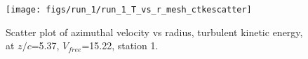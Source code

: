 \begin{figure}[H]
\centering
\texttt{[image: figs/run\_1/run\_1\_T\_vs\_r\_mesh\_ctkescatter]}
\caption{Scatter plot of azimuthal velocity vs radius, turbulent kinetic energy, at $z/c$=5.37, $V_{free}$=15.22, station 1.}
\label{fig:run_1_T_vs_r_mesh_ctkescatter}
\end{figure}


